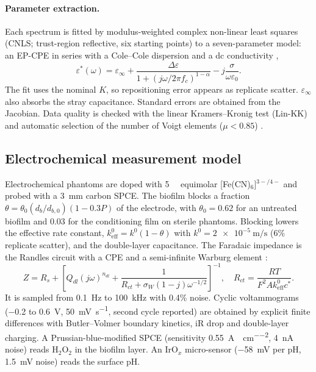 \documentclass[pdflatex,sn-mathphys-num]{sn-jnl}%
\begin{document}
\paragraph{Parameter extraction.} Each spectrum is fitted by modulus-weighted complex non-linear least squares (CNLS; trust-region reflective, six starting points) to a seven-parameter model: an EP-CPE in series with a Cole--Cole dispersion and a dc conductivity \cite{cole1941},
\begin{equation}
\varepsilon^*(\omega) = \varepsilon_\infty + \frac{\Delta\varepsilon}{1+(j\omega/2\pi f_c)^{1-\alpha}} - j\frac{\sigma}{\omega\varepsilon_0}.
\end{equation}
The fit uses the nominal $K$, so repositioning error appears as replicate scatter. $\varepsilon_\infty$ also absorbs the stray capacitance. Standard errors are obtained from the Jacobian. Data quality is checked with the linear Kramers--Kronig test (Lin-KK) and automatic selection of the number of Voigt elements ($\mu<0.85$) \cite{schonleber2014}.

\subsection{Electrochemical measurement model}

Electrochemical phantoms are doped with \SI{5}{\milli\molar} equimolar [Fe(CN)$_6$]$^{3-/4-}$ and probed with a \SI{3}{\milli\metre} carbon SPCE. The biofilm blocks a fraction $\theta = \theta_0 (d_b/d_{b,0})(1 - 0.3P)$ of the electrode, with $\theta_0=0.62$ for an untreated biofilm and $0.03$ for the conditioning film on sterile phantoms. Blocking lowers the effective rate constant, $k^0_{\mathrm{eff}} = k^0(1-\theta)$ with $k^0 = \SI{2e-5}{\metre\per\second}$ (6\% replicate scatter), and the double-layer capacitance. The Faradaic impedance is the Randles circuit with a CPE and a semi-infinite Warburg element \cite{bard2001,orazem2008,brug1984}:
\begin{equation}
Z = R_s + \left[Q_{dl}(j\omega)^{n_{dl}} + \frac{1}{R_{ct} + \sigma_W(1-j)\omega^{-1/2}}\right]^{-1}, \quad R_{ct} = \frac{RT}{F^2 A k^0_{\mathrm{eff}} c^{*}}.
\end{equation}
It is sampled from \SI{0.1}{\hertz} to \SI{100}{\kilo\hertz} with 0.4\% noise. Cyclic voltammograms (\num{-0.2} to \SI{0.6}{\volt}, \SI{50}{\milli\volt\per\second}, second cycle reported) are obtained by explicit finite differences with Butler--Volmer boundary kinetics, iR drop and double-layer charging. A Prussian-blue-modified SPCE (sensitivity \SI{0.55}{\ampere\per\molar\per\square\centi\metre}, \SI{4}{\nano\ampere} noise) reads H$_2$O$_2$ in the biofilm layer. An IrO$_x$ micro-sensor (\SI{-58}{\milli\volt} per pH, \SI{1.5}{\milli\volt} noise) reads the surface pH.
\end{document}
